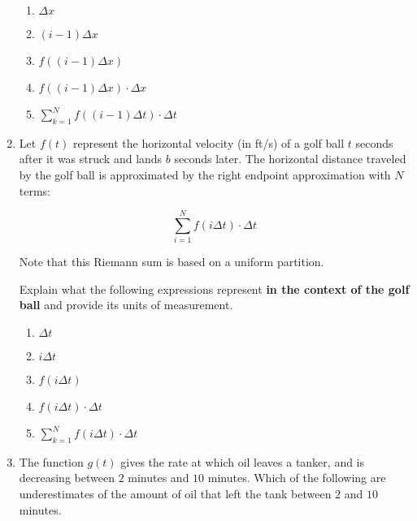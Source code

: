 \documentclass[12pt]{report}
\begin{document}
\begin{enumerate}
\begin{enumerate}

\item $\Delta x$

\item $(i-1)\Delta x$

\item $f((i-1)\Delta x)$

\item $f((i-1)\Delta x)\cdot \Delta x$

\item $\sum_{k=1}^Nf((i-1)\Delta t)\cdot \Delta t$


\end{enumerate}


\item Let $f(t)$ represent the horizontal velocity (in ft/s) of a golf ball $t$ seconds after it was struck and lands $b$ seconds later. The horizontal distance traveled by the golf ball is approximated by the right endpoint approximation with $N$terms:

$$\sum_{i=1}^N f(i\Delta t)\cdot \Delta t$$

Note that this Riemann sum is based on a uniform partition.

Explain what the following expressions represent {\bf in the context of the golf ball} and provide its units of measurement. 

\begin{enumerate}

\item $\Delta t$

\item $i\Delta t$

\item $f(i\Delta t)$

\item $f(i\Delta t)\cdot \Delta t$

\item $\sum_{k=1}^Nf(i\Delta t)\cdot \Delta t$



\end{enumerate}

\item The function $g(t)$ gives the rate at which oil leaves a tanker, and is decreasing between $2$ minutes and $10$ minutes. Which of the following are underestimates of the amount of oil that left the tank between $2$ and $10$ minutes.

\begin{enumerate}


\end{enumerate}
\end{enumerate}
\end{document}
